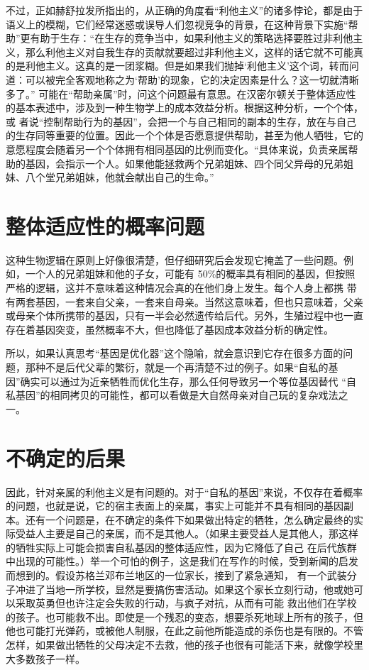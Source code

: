 不过，正如赫舒拉发所指出的，从正确的角度看“利他主义”的诸多悖论，都是由于语义上的模糊，它们经常迷惑或误导人们忽视竞争的背景，在这种背景下实施“帮助”更有助于生存：“在生存的竞争当中，如果利他主义的策略选择要胜过非利他主义，那么利他主义对自我生存的贡献就要超过非利他主义，这样的话它就不可能真的是利他主义。这真的是一团浆糊。但是如果我们抛掉‘利他主义’这个词，转而问道：可以被完全客观地称之为‘帮助’的现象，它的决定因素是什么？这一切就清晰多了。” 可能在“帮助亲属”时，问这个问题最有意思。在汉密尔顿关于整体适应性的基本表述中，涉及到一种生物学上的成本效益分析。根据这种分析，一个个体，或 者说“控制帮助行为的基因”，会把一个与自己相同的副本的生存，放在与自己的生存同等重要的位置。因此一个个体是否愿意提供帮助，甚至为他人牺牲，它的意愿程度会随着另一个个体拥有相同基因的比例而变化。“具体来说，负责亲属帮助的基因，会指示一个人。如果他能拯救两个兄弟姐妹、四个同父异母的兄弟姐妹、八个堂兄弟姐妹，他就会献出自己的生命。” 

\section{整体适应性的概率问题}

这种生物逻辑在原则上好像很清楚，但仔细研究后会发现它掩盖了一些问题。例如，一个人的兄弟姐妹和他的子女，可能有 50\%的概率具有相同的基因，但按照严格的逻辑，这并不意味着这种情况会真的在他们身上发生。每个人身上都携 带有两套基因，一套来自父亲，一套来自母亲。当然这意味着，但也只意味着，父亲或母亲个体所携带的基因，只有一半会必然遗传给后代。另外，生殖过程中也一直存在着基因突变，虽然概率不大，但也降低了基因成本效益分析的确定性。

所以，如果认真思考“基因是优化器”这个隐喻，就会意识到它存在很多方面的问题，那种不是后代父辈的繁衍，就是一个再清楚不过的例子。如果“自私的基 因”确实可以通过为近亲牺牲而优化生存，那么任何导致另一个等位基因替代 “自私基因”的相同拷贝的可能性，都可以看做是大自然母亲对自己玩的复杂戏法之一。

\section{不确定的后果}
因此，针对亲属的利他主义是有问题的。对于“自私的基因”来说，不仅存在着概率的问题，也就是说，它的宿主表面上的亲属，事实上可能并不具有相同的基因副本。还有一个问题是，在不确定的条件下如果做出特定的牺牲，怎么确定最终的实际受益人主要是自己的亲属，而不是其他人。（如果主要受益人是其他人，那这样的牺牲实际上可能会损害自私基因的整体适应性，因为它降低了自己 在后代族群中出现的可能性。）举一个可怕的例子，这是我们在写作的时候，受到新闻的启发而想到的。假设苏格兰邓布兰地区的一位家长，接到了紧急通知， 有一个武装分子冲进了当地一所学校，显然是要搞伤害活动。如果这个家长立刻行动，他或她可以采取英勇但也许注定会失败的行动，与疯子对抗，从而有可能 救出他们在学校的孩子。也可能救不出。即使是一个残忍的变态，想要杀死地球上所有的孩子，但他也可能打光弹药，或被他人制服，在此之前他所能造成的杀伤也是有限的。不管怎样，如果做出牺牲的父母决定不去救，他的孩子也很有可能活下来，就像学校里大多数孩子一样。

